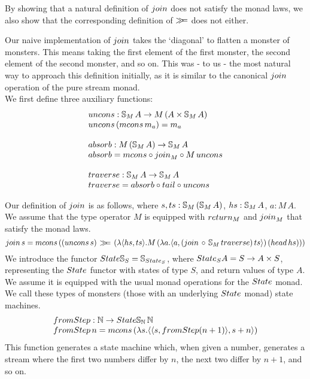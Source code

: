 By showing that a natural definition of $\join$ does not satisfy the monad laws, we also show that the corresponding definition of $\mathbin{\gg\!\!=}$ does not either.

Our naive implementation of $\join$ takes the `diagonal' to flatten a monster of monsters. This means taking the first element of the first monster, the second element of the second monster, and so on. This was - to us - the most natural way to approach this definition initially, as it is similar to the canonical $\join$ operation of the pure stream monad. \\

We first define three auxiliary functions:
$$
\begin{array}{l}
\uncons : \stream{M}\,A \rightarrow M\,(A \times \stream{M}\,A)\\
\uncons\, (\mcons\, m_a) = m_a \\
\,\\
\mathsf{absorb} : M\,(\stream{M}\,A) \rightarrow \stream{M}\,A \\
\mathsf{absorb} =  \mcons \comp \join_{M} \comp M\,\uncons \\
\,\\
\mathsf{traverse} : \stream{M}\,A \rightarrow \stream{M}\,A \\
\mathsf{traverse} = \mathsf{absorb} \comp \tail \comp \uncons
\end{array}
$$

Our definition of $\join$ is as follows, where $s, ts : \mathbb{S}_{M}\,(\mathbb{S}_{M}\, A)$, 
$hs : \mathbb{S}_{M}\, A$, $a : M\, A$. We assume that the type operator $M$ is equipped with $\return_M$ and $\join_M$ that satisfy the monad laws.
$$
\join\, s = \mcons\, ((\uncons\, s) \, \bind \,(\lambda \pair{hs}{ts} . M\,(\lambda a . \pair{a}{(\join\, \comp\, \stream{M}\,\mathsf{traverse})\, ts})\, (\head\, hs)))
$$
We introduce the functor $\state\stream{S} = \stream{\state_S}$, where $\state_S A = S \rightarrow A \times S$, representing the $\state$ functor with states of type $S$, and return values of type $A$. We assume it is equipped with the usual monad operations for the $\state$ monad. We call these types of monsters (those with an underlying $\state$ monad) state machines.
$$
\begin{array}{l}
\fromstepstr : \nat \rightarrow \state\stream{\nat}\,\nat \\
\fromstepstr\, n = \mcons\, (\lambda s. \pair{\pair{s}{\fromstepstr (n + 1)}}{s + n})
\end{array}
$$
This function generates a state machine which, when given a number, generates a stream where the first two numbers differ by $n$, the next two differ by $n + 1$, and so on.

